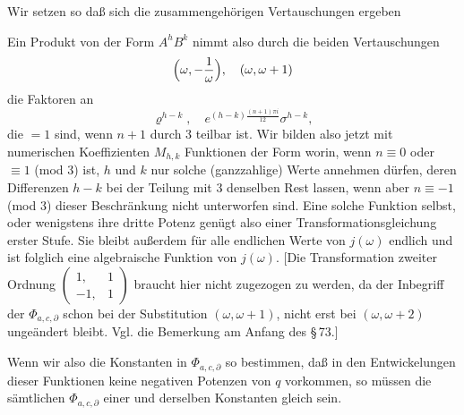 Wir setzen
so da\ss{} sich die zusammengeh\"origen Vertauschungen ergeben

Ein Produkt von der Form $A^h B^k$ nimmt also durch die beiden Vertauschungen
\[
\Bigl(\omega, -\frac{1}{\omega}\Bigr), \quad (\omega, \omega+1)
\]
die Faktoren an
\[
\varrho^{h-k}, \quad e^{(h-k)\frac{(n+1)\pi i}{12}}\sigma^{h-k},
\]
die $=1$ sind, wenn $n+1$ durch 3 teilbar ist. Wir bilden also jetzt mit numerischen Koeffizienten $M_{h,k}$ Funktionen der Form
worin, wenn $n \equiv 0$ oder $\equiv 1$ (mod 3) ist, $h$ und $k$ nur solche (ganzzahlige) Werte annehmen d\"urfen, deren Differenzen $h-k$ bei der Teilung mit 3 denselben Rest lassen, wenn aber $n \equiv -1$ (mod 3) dieser Beschr\"ankung nicht unterworfen sind. Eine solche Funktion selbst, oder wenigstens ihre dritte Potenz gen\"ugt also einer Transformationsgleichung erster Stufe. Sie bleibt au\ss{}erdem f\"ur alle endlichen Werte von $j(\omega)$ endlich und ist folglich eine  algebraische Funktion von $j(\omega)$. [Die Transformation zweiter Ordnung $\begin{pmatrix} 1, & 1\\ -1, & 1 \end{pmatrix}$ braucht hier nicht zugezogen zu werden, da der Inbegriff der $\Phi_{a,c,\partial}$ schon bei der Substitution $(\omega, \omega+1)$, nicht erst bei $(\omega, \omega+2)$ unge\"andert bleibt. Vgl. die Bemerkung am Anfang des §\,73.]

Wenn wir also die Konstanten in $\Phi_{a,c,\partial}$ so bestimmen, da\ss{} in den Entwickelungen dieser Funktionen keine negativen Potenzen von $q$ vorkommen, so m\"ussen die s\"amtlichen $\Phi_{a,c,\partial}$ einer und derselben Konstanten gleich sein.
